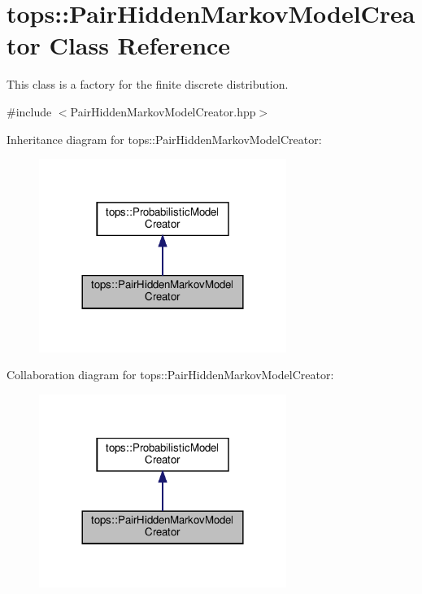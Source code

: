 \hypertarget{classtops_1_1PairHiddenMarkovModelCreator}{}\section{tops\+:\+:Pair\+Hidden\+Markov\+Model\+Creator Class Reference}
\label{classtops_1_1PairHiddenMarkovModelCreator}


This class is a factory for the finite discrete distribution.  




{\ttfamily \#include $<$Pair\+Hidden\+Markov\+Model\+Creator.\+hpp$>$}



Inheritance diagram for tops\+:\+:Pair\+Hidden\+Markov\+Model\+Creator\+:
\nopagebreak
\begin{figure}[H]
\begin{center}
\leavevmode
\includegraphics[width=228pt]{classtops_1_1PairHiddenMarkovModelCreator__inherit__graph}
\end{center}
\end{figure}


Collaboration diagram for tops\+:\+:Pair\+Hidden\+Markov\+Model\+Creator\+:
\nopagebreak
\begin{figure}[H]
\begin{center}
\leavevmode
\includegraphics[width=228pt]{classtops_1_1PairHiddenMarkovModelCreator__coll__graph}
\end{center}
\end{figure}
